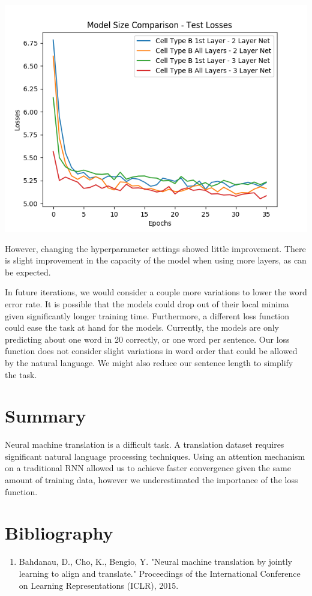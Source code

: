 \documentclass[letterpaper, 10pt]{article}
\begin{document}
\begin{multicols}{2}
\begin{center}
\includegraphics[scale=.4]{size_comparison_losses_test}
\end{center}

\noindent However, changing the hyperparameter settings showed little improvement.
There is slight improvement in the capacity of the model when using more layers, as can be expected.

In future iterations, we would consider a couple more variations to lower the word error rate.
It is possible that the models could drop out of their local minima given significantly longer
training time.
Furthermore, a different loss function could ease the task at hand for the models.
Currently, the models are only predicting about one word in 20 correctly, or one word per sentence.
Our loss function does not consider slight variations in word order that could be allowed by the
natural language.
We might also reduce our sentence length to simplify the task.

\section{Summary}
Neural machine translation is a difficult task.
A translation dataset requires significant natural language processing techniques.
Using an attention mechanism on a traditional RNN allowed us to achieve faster convergence given
the same amount of training data, however we underestimated the importance of the loss function.

\section{Bibliography}
\begin{enumerate}
\item Bahdanau, D., Cho, K., Bengio, Y. "Neural machine translation by jointly learning to align and translate." Proceedings of the International Conference on Learning Representations (ICLR), 2015.


\end{enumerate}
\end{multicols}
\end{document}
